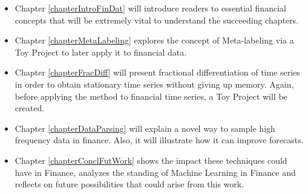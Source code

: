 \begin{itemize}
	\item Chapter \ref{chapterIntroFinDat} will introduce readers to
	essential financial concepts that will be extremely vital to understand
	the succeeding chapters.
	
	\item Chapter \ref{chapterMetaLabeling} explores the concept of 
	Meta-labeling via a Toy Project to later apply it to financial data.
	
	\item Chapter \ref{chapterFracDiff} will present fractional 
	differentiation of time series in order to obtain stationary time series 
	without giving up memory. Again, before applying the method to financial 
	time series, a Toy Project will be created.
	
	\item Chapter \ref{chapterDataParsing} will explain a novel way to 
	sample high frequency data in finance. Also, it will illustrate how it 
	can improve forecasts.
	
	\item Chapter \ref{chapterConclFutWork} shows the impact these 
	techniques could have in Finance, analyzes the standing of Machine 
	Learning in Finance and reflects on future possibilities that could 
	arise from this work.
\end{itemize}

